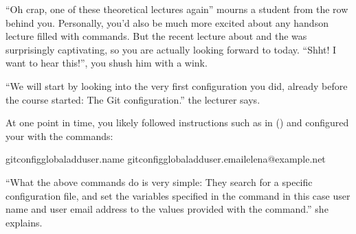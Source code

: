 \sphinxAtStartPar
“Oh crap, one of these theoretical lectures again” mourns a
student from the row behind you. Personally, you’d also
be much more excited
about any hands\sphinxhyphen{}on lecture filled with commands. But the
recent lecture about {\hyperref[\detokenize{glossary:term-git-annex}]{}} and the {\hyperref[\detokenize{glossary:term-object-tree}]{}}
was surprisingly captivating, so you are actually looking forward to today.
“Shht! I want to hear this!”, you shush him with a wink.

\sphinxAtStartPar
“We will start by looking into the very first configuration
you did, already before the course started: The 
Git configuration.” the lecturer says.

\ignorespaces 
\sphinxAtStartPar
At one point in time, you likely followed instructions such as
in {\hyperref[\detokenize{intro/installation:install}]{}} () and configured your
 with the commands:

\begin{sphinxVerbatim}[commandchars=\\\{\}]
gitconfig\PYGZhy{}\PYGZhy{}global\PYGZhy{}\PYGZhy{}adduser.name
gitconfig\PYGZhy{}\PYGZhy{}global\PYGZhy{}\PYGZhy{}adduser.emailelena@example.net
\end{sphinxVerbatim}

\sphinxAtStartPar
“What the above commands do is very simple: They search for
a specific configuration file, and set the variables specified
in the command \textendash{} in this case user name and user email address
\textendash{} to the values provided with the command.” she explains.


